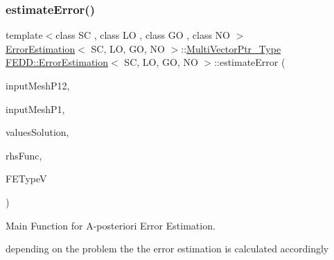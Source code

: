 \mbox{\label{classFEDD_1_1ErrorEstimation_ac2961578854f4f3c90d49e0f153cf379}} 
\subsubsection{\texorpdfstring{estimate\+Error()}{estimateError()}}
{\footnotesize\ttfamily template$<$class SC , class LO , class GO , class NO $>$ \\
\hyperlink{classFEDD_1_1ErrorEstimation}{Error\+Estimation}$<$ SC, LO, GO, NO $>$\+::\hyperlink{classFEDD_1_1ErrorEstimation_a5882ff373bf8c409b407b4fd1f42bda0}{Multi\+Vector\+Ptr\+\_\+\+Type} \hyperlink{classFEDD_1_1ErrorEstimation}{F\+E\+D\+D\+::\+Error\+Estimation}$<$ SC, LO, GO, NO $>$\+::estimate\+Error (\begin{DoxyParamCaption}\item[{\hyperlink{classFEDD_1_1ErrorEstimation_a862043dc355a1524640b5ef53e8eefa1}{Mesh\+Unstr\+Ptr\+\_\+\+Type}}]{input\+Mesh\+P12,  }\item[{\hyperlink{classFEDD_1_1ErrorEstimation_a862043dc355a1524640b5ef53e8eefa1}{Mesh\+Unstr\+Ptr\+\_\+\+Type}}]{input\+Mesh\+P1,  }\item[{\hyperlink{classFEDD_1_1ErrorEstimation_a8a53d809dfcf71abaffe46f85e6b4aa1}{Block\+Multi\+Vector\+Const\+Ptr\+\_\+\+Type}}]{values\+Solution,  }\item[{Rhs\+Func\+\_\+\+Type}]{rhs\+Func,  }\item[{string}]{F\+E\+TypeV }\end{DoxyParamCaption})}



Main Function for A-\/posteriori Error Estimation. 

depending on the problem the the error estimation is calculated accordingly


